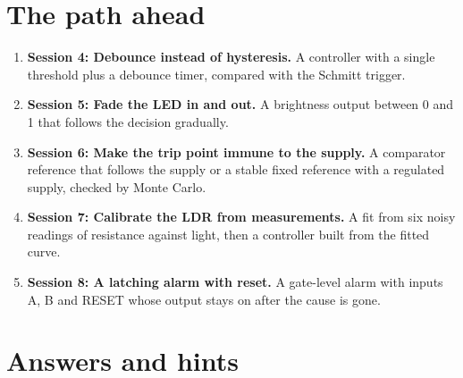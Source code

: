 \documentclass[11pt,a4paper]{article}
\begin{document}
\section{The path ahead}
\begin{enumerate}[nosep]
\item \textbf{Session 4: Debounce instead of hysteresis.} A controller with a single threshold plus a debounce timer, compared with the Schmitt trigger.
\item \textbf{Session 5: Fade the LED in and out.} A brightness output between 0 and 1 that follows the decision gradually.
\item \textbf{Session 6: Make the trip point immune to the supply.} A comparator reference that follows the supply or a stable fixed reference with a regulated supply, checked by Monte Carlo.
\item \textbf{Session 7: Calibrate the LDR from measurements.} A fit from six noisy readings of resistance against light, then a controller built from the fitted curve.
\item \textbf{Session 8: A latching alarm with reset.} A gate-level alarm with inputs A, B and RESET whose output stays on after the cause is gone.
\end{enumerate}

\section{Answers and hints}
\end{document}
